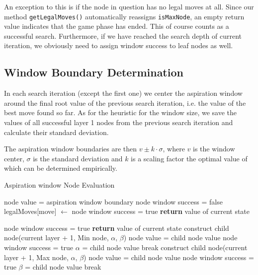 \documentclass[a4paper,12pt]{article}
\begin{document}
An exception to this is if the node in question has no legal moves at all. Since our method \texttt{getLegalMoves()} automatically reassigns \texttt{isMaxNode}, an empty return value indicates that the game phase has ended. This of course counts as a successful search. Furthermore, if we have reached the search depth of current iteration, we obviously need to assign window success to leaf nodes as well.

\subsection{Window Boundary Determination}
In each search iteration (except the first one) we center the aspiration window around the final root value of the previous search iteration, i.e. the value of the best move found so far. As for the heuristic for the window size, we save the values of all successful layer 1 nodes from the previous search iteration and calculate their standard deviation. 

The aspiration window boundaries are then $v \pm k \cdot \sigma$, where $v$ is the window center, $\sigma$ is the standard deviation and $k$ is a scaling factor the optimal value of which can be determined empirically.

\begin{algorithm}[H]
\caption{Aspiration window Node Evaluation}
\begin{algorithmic}
\Statex
\State \color{red} node value = aspiration window boundary 
\State node window success = false \color{black}
\Statex
\State legalMoves[move] $\gets$ 
\Statex
{}
    \State \color{red} node window success = true \color{black}
    \State \textbf{return} value of current state
    
\Statex
{}
    \State \color{red} node window success = true \color{black}
    \State \textbf{return} value of current state
\Statex
{}
        \State construct child node(current layer + 1, Min node, $\alpha$, $\beta$)
        \State {}
            \State node value = child node value
            \State \color{red} node window success = true \color{black}
            \State $\alpha$ = child node value
            \If{$\alpha \geq \beta$}
                \State break
            \EndIf
        \EndIf
    \EndFor
\Statex
{}
        \State construct child node(current layer + 1, Max node, $\alpha$, $\beta$)
        \State {}
            \State node value = child node value
            \State \color{red} node window success = true \color{black}
            \State $\beta$ = child node value
            \If{$\alpha \geq \beta$}
                \State break
            \EndIf
        \EndIf
    \EndFor
\EndIf
\EndFunction
\end{algorithmic}
\end{algorithm}
\end{document}
